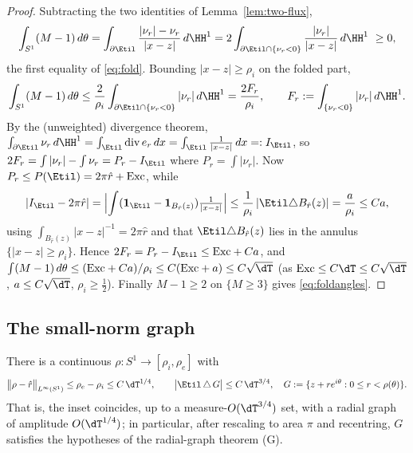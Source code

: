 \begin{proof}
Subtracting the two identities of Lemma~\ref{lem:two-flux},
\[
   \int_{S^1}(M-1)\,d\theta
   =\int_{\partial\Etil}\frac{|\nu_r|-\nu_r}{|x-z|}\,d\HH^1
   =2\int_{\partial\Etil\cap\{\nu_r<0\}}\frac{|\nu_r|}{|x-z|}\,d\HH^1\ \ge0,
\]
the first equality of \eqref{eq:fold}. Bounding $|x-z|\ge\rho_i$ on the
folded part,
\[
   \int_{S^1}(M-1)\,d\theta\le\frac{2}{\rho_i}\int_{\partial\Etil\cap\{\nu_r<0\}}
   |\nu_r|\,d\HH^1=\frac{2F_r}{\rho_i},\qquad
   F_r:=\int_{\{\nu_r<0\}}|\nu_r|\,d\HH^1 .
\]
By the (unweighted) divergence theorem, $\int_{\partial\Etil}\nu_r\,d\HH^1
=\int_{\Etil}\operatorname{div}e_r\,dx=\int_{\Etil}\frac{1}{|x-z|}\,dx=:I_{\Etil}$,
so $2F_r=\int|\nu_r|-\int\nu_r=P_r-I_{\Etil}$ where $P_r=\int|\nu_r|$. Now
$P_r\le P(\Etil)=2\pi\hat r+\mathrm{Exc}$, while
\[
   |I_{\Etil}-2\pi\hat r|
   =\Bigl|\int(\mathbf 1_{\Etil}-\mathbf 1_{B_{\hat r}(z)})\tfrac{1}{|x-z|}\Bigr|
   \le\frac{1}{\rho_i}\,|\Etil\triangle B_{\hat r}(z)|=\frac{a}{\rho_i}\le Ca,
\]
using $\int_{B_{\hat r}(z)}|x-z|^{-1}=2\pi\hat r$ and that
$\Etil\triangle B_{\hat r}(z)$ lies in the annulus
$\{|x-z|\ge\rho_i\}$. Hence $2F_r=P_r-I_{\Etil}\le\mathrm{Exc}+Ca$, and
$\int(M-1)\,d\theta\le(\mathrm{Exc}+Ca)/\rho_i\le C(\mathrm{Exc}+a)\le
C\sqrt\dT$ (as $\mathrm{Exc}\le C\dT\le C\sqrt\dT$, $a\le C\sqrt\dT$,
$\rho_i\ge\tfrac12$). Finally $M-1\ge2$ on $\{M\ge3\}$ gives
\eqref{eq:foldangles}.
\end{proof}

\subsection{The small-norm graph}

\begin{theorem}\label{thm:graph}
There is a continuous $\rho:S^1\to[\rho_i,\rho_e]$ with
\begin{equation}\label{eq:graph}
   \bigl\|\rho-\hat r\bigr\|_{L^\infty(S^1)}\le \rho_e-\rho_i\le C\,\dT^{1/4},
   \qquad
   \bigl|\Etil\,\triangle\,G\bigr|\le C\,\dT^{3/4},
   \quad G:=\{z+r e^{i\theta}:0\le r<\rho(\theta)\}.
\end{equation}
That is, the inset coincides, up to a measure-$O(\dT^{3/4})$ set, with a
radial graph of amplitude $O(\dT^{1/4})$; in particular, after rescaling to
area $\pi$ and recentring, $G$ satisfies the hypotheses of the
radial-graph theorem \textup{(G)}.
\end{theorem}

